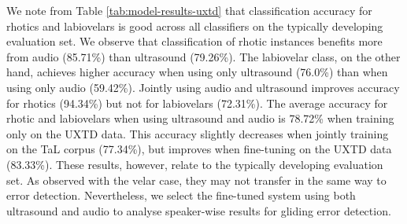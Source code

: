 We note from Table \ref{tab:model-results-uxtd} that classification accuracy for rhotics and labiovelars is good across all classifiers on the typically developing evaluation set.
We observe that classification of rhotic instances benefits more from audio (85.71\%) than ultrasound (79.26\%).
The labiovelar class, on the other hand, achieves higher accuracy when using only ultrasound (76.0\%) than when using only audio (59.42\%).
Jointly using audio and ultrasound improves accuracy for rhotics (94.34\%) but not for labiovelars (72.31\%).
The average accuracy for rhotic and labiovelars when using ultrasound and audio is 78.72\% when training only on the UXTD data.
This accuracy slightly decreases when jointly training on the TaL corpus (77.34\%), but improves when fine-tuning on the UXTD data (83.33\%).
These results, however, relate to the typically developing evaluation set.
As observed with the velar case, they may not transfer in the same way to error detection.
Nevertheless, we select the fine-tuned system using both ultrasound and audio to analyse speaker-wise results for gliding error detection.

\begin{table}[t]
\centering
{}
\caption{Speaker-wise results for gliding error detection using the UXSSD rhotic samples identified as correct productions or gliding substitutions. Cohen's $\kappa$ is calculated on expert and model binary scores.
Results are generated by the fine-tuned system using both audio and ultrasound, with
scores computed using \enquote{rhotic} and \enquote{labiovelar} as expected and competing classes, respectively.
}
\label{tab:model-results-rhotic}
\end{table}


